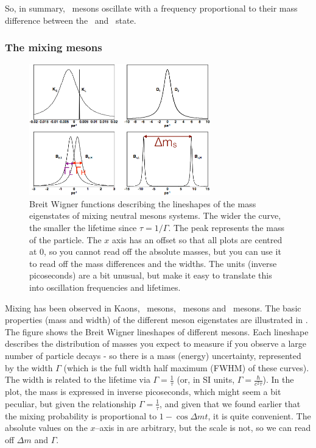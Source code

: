 So, in summary, \Bo\ mesons oscillate with a frequency proportional to their mass difference between the \Bo\ and \Bob\ state. 

\subsubsection{The mixing mesons}
\begin{figure}
\centering
\includegraphics[width=0.7\textwidth]{fig/C_P_CP/MixingMesons}
\caption{Breit Wigner functions describing the lineshapes of the mass eigenstates of mixing neutral mesons systems. The wider the curve, the smaller the lifetime since $\tau = 1/\Gamma$. The peak represents the mass of the particle. The $x$ axis has an offset so that all plots are centred at $0$, so you cannot read off the absolute masses, but you can use it to read off the mass differences and the widths. The units (inverse picoseconds) are a bit unusual, but make it easy to translate this into oscillation frequencies and lifetimes.\label{fig:MixingMesons}}
\end{figure}
Mixing has been observed in Kaons, \Do\ mesons, \Bo\ mesons and \Bso\ mesons. The basic properties (mass and width) of the different meson eigenstates are illustrated in . The figure shows the Breit Wigner lineshapes of different mesons. Each lineshape describes the distribution of masses you expect to measure if you observe a large number of particle decays - so there is a mass (energy) uncertainty, represented by the width $\Gamma$ (which is the full width half maximum (FWHM) of these curves). The width is related to the lifetime via $\Gamma = \frac{1}{\tau}$ (or, in SI units, $\Gamma = \frac{\hbar}{c^2\tau}$).  In the plot, the mass is expressed in inverse picoseconds, which might seem a bit peculiar, but given the relationship $\Gamma = \frac{1}{\tau}$, and given that we found earlier that the mixing probability is proportional to $1-\cos\Delta\!m t$, it is quite convenient. The absolute values on the $x$--axis in  are arbitrary, but the scale is not, so we can read off $\Delta m$ and $\Gamma$.

